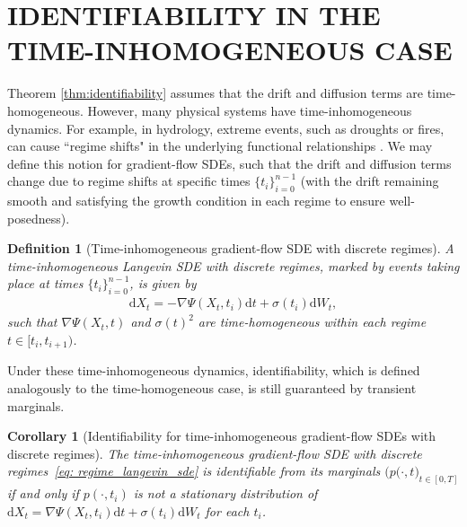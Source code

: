 \documentclass[twoside]{article}
\newcommand{\R} {\mathbb R}
\newcommand{\dXt}{\mathrm{d}X_t}
\newcommand{\dt}{\mathrm{d}t}
\newcommand{\dWt}{\mathrm{d}W_t}
\newtheorem{cor}[theorem]{Corollary}
\newtheorem{defn}[theorem]{Definition}
\begin{document}
\section{IDENTIFIABILITY IN THE TIME-INHOMOGENEOUS CASE}
\label{sec:time_inhomo}
Theorem \ref{thm:identifiability} assumes that the drift and diffusion terms are time-homogeneous. However, many physical systems have time-inhomogeneous dynamics. For example, in hydrology, extreme events, such as droughts or fires, can cause ``regime shifts" in the underlying functional relationships \citep{runge2019inferring, gunther2024causal,pedersen1995new,seibert2010effects,maina2020watersheds}. We may define this notion for gradient-flow SDEs, such that the drift and diffusion terms change due to regime shifts at specific times $\{t_i\}_{i=0}^{n-1}$ (with the drift remaining smooth and satisfying the growth condition in each regime to ensure well-posedness).

\begin{defn}[Time-inhomogeneous gradient-flow SDE with discrete regimes] A time-inhomogeneous Langevin SDE with discrete regimes, marked by events taking place at times $\{t_i\}_{i=0}^{n-1}$, is given by
\begin{align}
    \dXt{}=-\nabla\Psi(X_t,t_i)\dt{}+\sigma(t_i)\dWt{},
    \label{eq: regime_langevin_sde}
\end{align}
such that $\nabla\Psi(X_t,t)$ and $\sigma(t)^2$ are time-homogeneous within each regime $t \in [t_i, t_{i+1})$.
\end{defn}

Under these time-inhomogeneous dynamics, identifiability, which is defined analogously to the time-homogeneous case, is still guaranteed by transient marginals.

\begin{cor}[Identifiability for time-inhomogeneous gradient-flow SDEs with discrete regimes]
The time-inhomogeneous gradient-flow SDE with discrete regimes~\eqref{eq: regime_langevin_sde} is identifiable from its marginals $\bigl(p(\cdot, t\bigr)_{t \in [0,T]}$ if and only if $p(\cdot, t_i)$ is not a stationary distribution of $\dXt{}=\nabla\Psi(X_t,t_i)\dt{}+\sigma(t_i)\dWt{}$ for each $t_i$.
\label{cor:regime_shift}
\end{cor}

\end{document}
